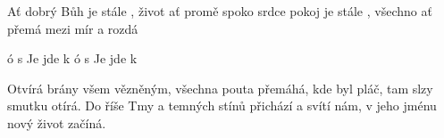 \begin{TEXT}{Ať dobrý Bůh}
\SLOKA	{}   je stále , život  ať promě \NL
	spoko srdce  pokoj   \NL
	   je stále , všechno   ať přemá \NL
	mezi  mír a  rozdá  

\REFREN 	{} ó s   Je jde k    \NL
{} ó s   Je jde k  

\SLOKA	Otvírá brány všem vězněným, všechna pouta přemáhá,\NL
	kde byl pláč, tam slzy smutku otírá.\NL
	Do říše Tmy a temných stínů přichází a svítí nám,\NL
	v jeho jménu nový život začíná.
\end{TEXT}
